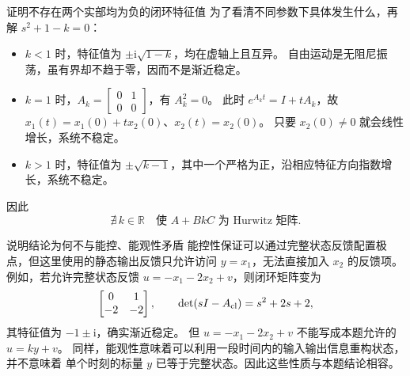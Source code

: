 \documentclass[11pt]{article}
\begin{document}
\begin{solution}
\begin{proofstep}{证明不存在两个实部均为负的闭环特征值}
为了看清不同参数下具体发生什么，再解 $s^2+1-k=0$：
\begin{itemize}
\item $k<1$ 时，特征值为 $\pm\mathrm i\sqrt{1-k}$，均在虚轴上且互异。
自由运动是无阻尼振荡，虽有界却不趋于零，因而不是渐近稳定。
\item $k=1$ 时，$A_k=\begin{bmatrix}0&1\\0&0\end{bmatrix}$，有 $A_k^2=0$。
此时 $e^{A_kt}=I+tA_k$，故 $x_1(t)=x_1(0)+tx_2(0)$、$x_2(t)=x_2(0)$。
只要 $x_2(0)\ne0$ 就会线性增长，系统不稳定。
\item $k>1$ 时，特征值为 $\pm\sqrt{k-1}$，其中一个严格为正，沿相应特征方向指数增长，系统不稳定。
\end{itemize}
因此
\[
\boxed{\nexists\,k\in\mathbb R\quad\text{使 }A+BkC\text{ 为 Hurwitz 矩阵}.}
\]
\end{proofstep}

\begin{proofstep}{说明结论为何不与能控、能观性矛盾}
能控性保证可以通过完整状态反馈配置极点，但这里使用的静态输出反馈只允许访问
$y=x_1$，无法直接加入 $x_2$ 的反馈项。
例如，若允许完整状态反馈 $u=-x_1-2x_2+v$，则闭环矩阵变为
\[
\begin{bmatrix}0&1\\-2&-2\end{bmatrix},\qquad
\det(sI-A_{\rm cl})=s^2+2s+2,
\]
其特征值为 $-1\pm\mathrm i$，确实渐近稳定。
但 $u=-x_1-2x_2+v$ 不能写成本题允许的 $u=ky+v$。
同样，能观性意味着可以利用一段时间内的输入输出信息重构状态，并不意味着
单个时刻的标量 $y$ 已等于完整状态。因此这些性质与本题结论相容。
\end{proofstep}
\end{solution}
\end{document}
